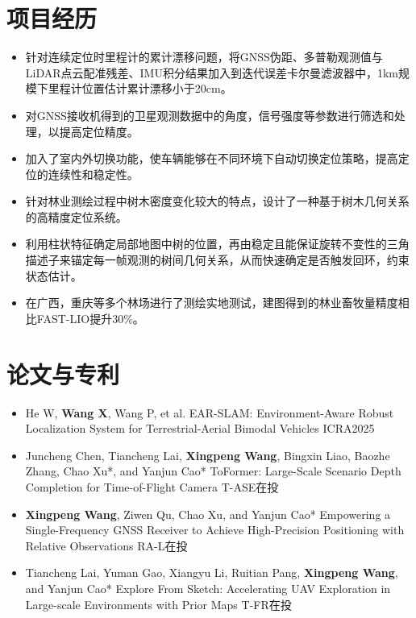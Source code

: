 \documentclass{resume}
\begin{document}
\section{项目经历}

\begin{itemize}
	\item {针对连续定位时里程计的累计漂移问题，将GNSS伪距、多普勒观测值与LiDAR点云配准残差、IMU积分结果加入到迭代误差卡尔曼滤波器中，1km规模下里程计位置估计累计漂移小于20cm。}
	\item {对GNSS接收机得到的卫星观测数据中的角度，信号强度等参数进行筛选和处理，以提高定位精度。}
	\item {加入了室内外切换功能，使车辆能够在不同环境下自动切换定位策略，提高定位的连续性和稳定性。}
\end{itemize}
\begin{itemize}
	\item {针对林业测绘过程中树木密度变化较大的特点，设计了一种基于树木几何关系的高精度定位系统。}
	\item {利用柱状特征确定局部地图中树的位置，再由稳定且能保证旋转不变性的三角描述子来锚定每一帧观测的树间几何关系，从而快速确定是否触发回环，约束状态估计。}
	\item {在广西，重庆等多个林场进行了测绘实地测试，建图得到的林业畜牧量精度相比FAST-LIO提升30\%。}
\end{itemize}

\section{论文与专利}
\begin{itemize}[parsep=0.2ex]
  \item {He W, \textbf{Wang X}, Wang P, et al. EAR-SLAM: Environment-Aware Robust Localization System for Terrestrial-Aerial Bimodal Vehicles} 
  \hfill{ICRA2025}
  \item {Juncheng Chen, Tiancheng Lai, \textbf{Xingpeng Wang}, Bingxin Liao, Baozhe Zhang, Chao Xu*, and Yanjun Cao* ToFormer: Large-Scale Scenario Depth Completion for Time-of-Flight Camera}	
  \hfill{T-ASE在投}
  \item {\textbf{Xingpeng Wang}, Ziwen Qu, Chao Xu, and Yanjun Cao* Empowering a Single-Frequency GNSS Receiver to Achieve High-Precision Positioning with Relative Observations}
  \hfill{RA-L在投}
  \item {Tiancheng Lai, Yuman Gao, Xiangyu Li, Ruitian Pang, \textbf{Xingpeng Wang}, and Yanjun Cao* Explore From Sketch: Accelerating UAV Exploration in Large-scale Environments with Prior Maps}
  \hfill{T-FR在投}
\end{itemize}
\end{document}
